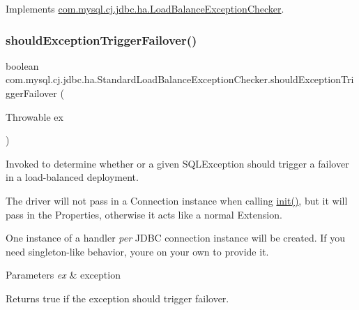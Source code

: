 Implements \mbox{\hyperlink{interfacecom_1_1mysql_1_1cj_1_1jdbc_1_1ha_1_1_load_balance_exception_checker_a41c1fd3f7eb7f6cd92cc174465b6574e}{com.\+mysql.\+cj.\+jdbc.\+ha.\+Load\+Balance\+Exception\+Checker}}.

\mbox{\label{classcom_1_1mysql_1_1cj_1_1jdbc_1_1ha_1_1_standard_load_balance_exception_checker_a24152ea8a4fd653b8597301b47c9624f}} 
\subsubsection{\texorpdfstring{should\+Exception\+Trigger\+Failover()}{shouldExceptionTriggerFailover()}}
{\footnotesize\ttfamily boolean com.\+mysql.\+cj.\+jdbc.\+ha.\+Standard\+Load\+Balance\+Exception\+Checker.\+should\+Exception\+Trigger\+Failover (\begin{DoxyParamCaption}\item[{Throwable}]{ex }\end{DoxyParamCaption})}

Invoked to determine whether or a given S\+Q\+L\+Exception should trigger a failover in a load-\/balanced deployment.

The driver will not pass in a Connection instance when calling \mbox{\hyperlink{classcom_1_1mysql_1_1cj_1_1jdbc_1_1ha_1_1_standard_load_balance_exception_checker_af2f4516746c3615d1a4f3a191805b374}{init()}}, but it will pass in the Properties, otherwise it acts like a normal Extension.

One instance of a handler {\itshape per} J\+D\+BC connection instance will be created. If you need singleton-\/like behavior, you\textquotesingle{}re on your own to provide it.


\begin{DoxyParams}{Parameters}
{\em ex} & exception \\
\hline
\end{DoxyParams}
\begin{DoxyReturn}{Returns}
true if the exception should trigger failover. 
\end{DoxyReturn}


